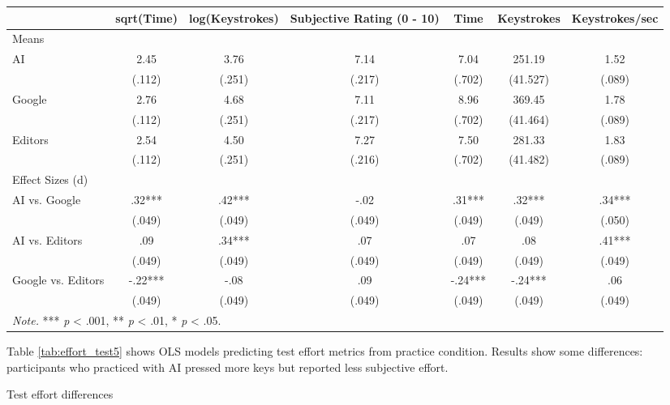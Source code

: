 \documentclass[11pt]{report}
\begin{document}
\begin{append}
\begin{landscape}
\begin{table}[]
    \begin{tabular}{lcccccc}
\toprule
  & sqrt(Time) & log(Keystrokes) & Subjective Rating (0 - 10) & Time & Keystrokes & Keystrokes/sec \\ 
\midrule
\multicolumn{7}{l}{Means} \\[2.5pt] 
\midrule
AI & 2.45 & 3.76 & 7.14 & 7.04 & 251.19 & 1.52 \\ 
 & (.112) & (.251) & (.217) & (.702) & (41.527) & (.089) \\ 
Google & 2.76 & 4.68 & 7.11 & 8.96 & 369.45 & 1.78 \\ 
 & (.112) & (.251) & (.217) & (.702) & (41.464) & (.089) \\ 
Editors & 2.54 & 4.50 & 7.27 & 7.50 & 281.33 & 1.83 \\ 
 & (.112) & (.251) & (.216) & (.702) & (41.482) & (.089) \\ 
\midrule
\multicolumn{7}{l}{Effect Sizes (d)} \\[2.5pt] 
\midrule
AI vs. Google & .32*** & .42*** & -.02 & .31*** & .32*** & .34*** \\ 
 & (.049) & (.049) & (.049) & (.049) & (.049) & (.050) \\ 
AI vs. Editors & .09 & .34*** & .07 & .07 & .08 & .41*** \\ 
 & (.049) & (.049) & (.049) & (.049) & (.049) & (.049) \\ 
Google vs. Editors & -.22*** & -.08 & .09 & -.24*** & -.24*** & .06 \\ 
 & (.049) & (.049) & (.049) & (.049) & (.049) & (.049) \\ 
\midrule
\multicolumn{6}{l}{\textit{Note.} *** \textit{p} < .001, ** \textit{p} < .01, * \textit{p} < .05.}
\vspace{5pt}
    \end{tabular}
    \label{tab:effort_practice5}
\end{table}
\end{landscape}
Table \ref{tab:effort_test5} shows OLS models predicting test effort metrics from practice condition. Results show some differences: participants who practiced with AI pressed more keys but reported less subjective effort.
\begin{landscape}
\begin{table}[]
    \centering
        \caption{Test effort differences}


\end{table}
\end{landscape}
\end{append}
\end{document}
